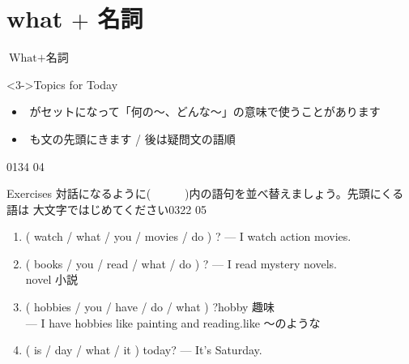\documentclass[aspectratio=169,xcolor={dvipsnames,table}]{beamer}
\begin{document}
\section{what $+$ 名詞}
\begin{frame}[plain]{$\text{What} + \text{名詞}$}
\begin{enumerate}
\end{enumerate}

\begin{block}<3->{Topics for Today}
\pause
\begin{itemize}[square]\small
 \item {}\,\,がセットになって「何の〜、どんな～」の意味で使うことがあります
 \item {}\,\,も文の先頭にきます / 後は疑問文の語順
\end{itemize}
     \end{block}

\mbox{}\hfill{\tiny 0134}\,{\tiny{}\,04}



\end{frame}
\begin{frame}[plain]{Exercises}
 対話になるように(~~~~~~)内の語句を並べ替えましょう。先頭にくる語は
大文字ではじめてください\hfill{\tiny 0322}\,{\tiny{}\,05}

\begin{enumerate}
 \item ( watch / what / you / movies / do ) ? --- I watch action movies.\\
 \item ( books / you / read / what / do ) ? --- I read mystery novels.\\
\hfill{\scriptsize novel  小説}
 \item ( hobbies / you / have / do / what ) ?\hfill{}{\scriptsize hobby  趣味}\\
\mbox{}\hspace{20pt}--- I have hobbies like painting and reading.\hfill{}{\scriptsize like 〜のような}\\
 \item ( is / day / what / it )  today? --- It's Saturday.\\
\hfill{}
\end{enumerate}

\end{frame}
\end{document}

